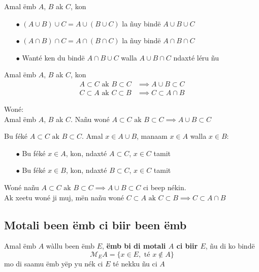 \documentclass[twoside, a4paper]{article}
\begin{document}
\begin{tcolorbox}[enhanced jigsaw,breakable,pad at break*=1mm, colback=orange!5!white,colframe=white!75!black,title= Seetlu,
  watermark color=white]
Amal ëmb $A$, $B$ ak $C$, kon 
\begin{itemize}
    \item[$\bullet$] $(A \cup B) \cup C = A \cup (B \cup C)$ la ñuy bindë $A \cup B \cup C$
    \item[$\bullet$] $(A \cap B) \cap C = A \cap (B \cap C)$ la ñuy bindë $A \cap B \cap C$
    \item[$\bullet$] Wanté ken du bindë $A \cap B \cup C$ walla $A \cup B \cap C$ ndaxté léru ñu
\end{itemize} 
\end{tcolorbox}


\begin{tcolorbox}[enhanced jigsaw,breakable,pad at break*=1mm, colback=blue!5!white,colframe=white!75!black,title= Tèg\footnote{Proposition},
  watermark color=white]
Amal ëmb $A$, $B$ ak $C$, kon 
\begin{align*}
    A \subset C\text{ ak } B \subset C &\implies A \cup B \subset C \\
    C \subset A \text{ ak } C \subset B  &\implies C \subset A \cap B 
\end{align*}
\end{tcolorbox}
Woné:\\
Amal ëmb $A$, $B$ ak $C$. Nañu woné $A \subset C\text{ ak } B \subset C \implies A \cup B \subset C $

Bu féké $A \subset C\text{ ak } B \subset C$. Amal $x \in A \cup B$, manaam $x\in A$ walla $x\in B$:
\begin{itemize}
    \item[$\bullet$] Bu féké $x\in A$, kon, ndaxté $A \subset C$, $x \in C$ tamit
    \item[$\bullet$] Bu féké $x\in B$, kon, ndaxté $B \subset C$, $x \in C$ tamit
\end{itemize}
Woné nañu $A \subset C\text{ ak } B \subset C \implies A \cup B \subset C $ ci beep nékin.\\

Ak xeetu woné ji muj, mën nañu woné $C \subset A \text{ ak } C \subset B  \implies C \subset A \cap B $


\subsection{Motali been ëmb ci biir been ëmb}
\begin{tcolorbox}[enhanced jigsaw,breakable,pad at break*=1mm, colback=red!5!white,colframe=white!75!black,title= Téeki,watermark color=white]
Amal ëmb $A$ wàllu been ëmb $E$, \textbf{ëmb bi di motali $A$ ci biir $E$}, ñu di ko bindë $$\mathcal{M}_{E}A = \big \{x \in E, \text{ té } x \not \in A\}$$
mo di saamu ëmb yëp yu nék ci $E$ té nekku ñu ci $A$
\end{tcolorbox}
\end{document}

